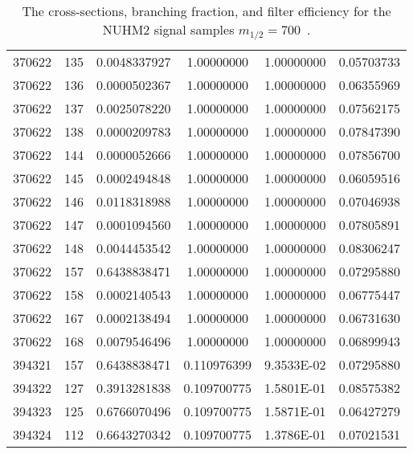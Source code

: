 \begin{table}[htp]
{{\begin{tabular}{cccccc}
370622 & 135         & 0.0048337927         & 1.00000000  & 1.00000000        & 0.05703733\\
370622 & 136         & 0.0000502367         & 1.00000000  & 1.00000000        & 0.06355969\\
370622 & 137         & 0.0025078220         & 1.00000000  & 1.00000000        & 0.07562175\\
370622 & 138         & 0.0000209783         & 1.00000000  & 1.00000000        & 0.07847390\\
370622 & 144         & 0.0000052666         & 1.00000000  & 1.00000000        & 0.07856700\\
370622 & 145         & 0.0002494848         & 1.00000000  & 1.00000000        & 0.06059516\\
370622 & 146         & 0.0118318988         & 1.00000000  & 1.00000000        & 0.07046938\\
370622 & 147         & 0.0001094560         & 1.00000000  & 1.00000000        & 0.07805891\\
370622 & 148         & 0.0044453542         & 1.00000000  & 1.00000000        & 0.08306247\\
370622 & 157         & 0.6438838471         & 1.00000000  & 1.00000000        & 0.07295880\\
370622 & 158         & 0.0002140543         & 1.00000000  & 1.00000000        & 0.06775447\\
370622 & 167         & 0.0002138494         & 1.00000000  & 1.00000000        & 0.06731630\\
370622 & 168         & 0.0079546496         & 1.00000000  & 1.00000000        & 0.06899943\\
394321 & 157         & 0.6438838471         & 0.110976399 & 9.3533E-02        & 0.07295880\\
394322 & 127         & 0.3913281838         & 0.109700775 & 1.5801E-01        & 0.08575382\\
394323 & 125         & 0.6766070496         & 0.109700775 & 1.5871E-01        & 0.06427279\\
394324 & 112         & 0.6643270342         & 0.109700775 & 1.3786E-01        & 0.07021531\\
\hline
\hline
\end{tabular}
}
}
\caption{The cross-sections, branching fraction, and filter efficiency for the NUHM2 signal samples $m_{1/2} = 700$~{\GeV}.}
\label{tab:app_xsec_m12_700}
\end{table}%

